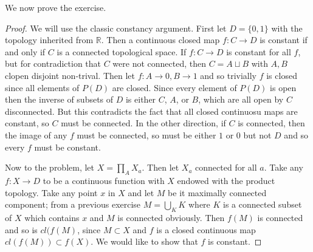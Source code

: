 \documentclass[11pt]{amsart}
\theoremstyle{definition}
\numberwithin{theorem}{section}
\numberwithin{definition}{section}
\numberwithin{equation}{section}
\begin{document}
We now prove the exercise.
\begin{proof}
We will use the classic constancy argument. First let $D = \{0,1\}$ with the topology inherited from $\mathbb{R}$. Then a continuous closed map $f: C \to D$ is constant if and only if $C$ is a connected topological space. If $f: C \to D$ is constant for all $f$, but for contradiction that $C$ were not connected, then $C = A \sqcup B$ with $A,B$ clopen disjoint non-trival. Then let $f:A \to 0, B \to 1$ and so trivially $f$ is closed since all elements of $P(D)$ are closed. Since every element of $P(D)$ is open then the inverse of subsets of $D$ is either $C$, $A$, or $B$, which are all open by $C$ disconnected. But this contradicts the fact that all closed continuosu maps are constant, so $C$ must be connected. In the other direction, if $C$ is connected, then the image of any $f$ must be connected, so must be either $1$ or $0$ but not $D$ and so every $f$ must be constant.

Now to the problem, let $X = \prod_A X_a$. Then let $X_a$ connected for all $a$. Take any $f: X \to D$ to be a continuous function with $X$ endowed with the product topology. Take any point $x$ in $X$ and let $M$ be it maximally connected component; from a previous exercise $M = \bigcup_{K} K$ where $K$ is a connected subset of $X$ which contains $x$ and $M$ is connected obviously. Then $f(M)$ is connected and so is $cl(f(M)$,
since $M \subset X$ and $f$ is a closed continuous map $cl(f(M)) \subset f(X)$. We  would like to show that $f$
is constant.


\end{proof}
\end{document}
